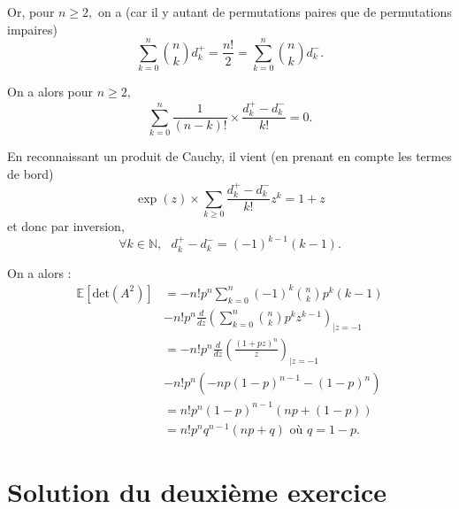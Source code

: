\begin{enumerate}
Or, pour $n\geq 2,$ on a (car il y autant de permutations paires que de permutations impaires) $$\sum_{k=0}^{n}\binom{n}{k}d_{k}^{+}=\frac{n!}{2}=\sum_{k=0}^{n}\binom{n}{k}d_{k}^{-}.$$

On a alors pour $n\geq 2,$ $$\sum_{k=0}^{n}\frac{1}{(n-k)!}\times \frac{d_{k}^{+}-d_{k}^{-}}{k!}=0.$$

En reconnaissant un produit de Cauchy, il vient (en prenant en compte les termes de bord) 
$$\exp(z)\times \sum_{k\geq 0}\frac{d_{k}^{+}-d_{k}^{-}}{k!}z^{k}=1+z$$ et donc par inversion, $$\forall k\in\mathbb{N},\mbox{ } d_{k}^{+}-d_{k}^{-}=(-1)^{k-1}(k-1).$$

On a alors :
\begin{align*}
\mathbb{E}[\mbox{det}(A^{2})] & =  -n!p^{n}\sum_{k=0}^{n}(-1)^{k}\binom{n}{k}p^{k}(k-1)\\
& -n!p^{n}\frac{d}{dz}\left(\sum_{k=0}^{n}\binom{n}{k}p^{k}z^{k-1}\right)_{|z=-1}\\
& = -n!p^{n}\frac{d}{dz}\left(\frac{(1+pz)^{n}}{z}\right)_{|z=-1}\\
& -n!p^{n}\left(-np(1-p)^{n-1}-(1-p)^{n}\right)\\
& =n!p^{n}(1-p)^{n-1}(np+(1-p))\\
& = n!p^{n}q^{n-1}(np+q) \mbox{ où } q=1-p.
\end{align*}

\end{enumerate}

\section{Solution du deuxième exercice}

